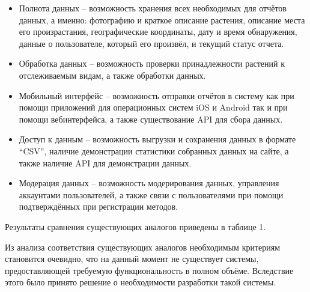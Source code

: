 \begin{itemize}[topsep=0pt, parsep=0pt, itemsep=0pt, wide=0.5cm]
	\item Полнота данных -- возможность хранения всех необходимых для отчётов данных, а именно: фотографию и краткое описание растения, описание места его произрастания, географические координаты, дату и время обнаружения, данные о пользователе, который его произвёл, и текущий статус отчета.
	\item Обработка данных -- возможность проверки принадлежности растений к отслеживаемым видам, а также обработки данных.
	\item Мобильный интерфейс -- возможность отправки отчётов в систему как при помощи приложений для операционных систем iOS и Android так и при помощи вебинтерфейса, а также существование API для сбора данных.
	\item Доступ к данным -- возможность выгрузки и сохранения данных в формате “CSV”, наличие демонстрации статистики собранных данных на сайте, а также наличие API для демонстрации данных.
	\item Модерация данных -- возможность модерирования данных, управления аккаунтами пользователей, а также связи с пользователями при помощи подтверждённых при регистрации методов.
\end{itemize}

\nwln
Результаты сравнения существующих аналогов приведены в таблице 1.
\tableone

\nwln
Из анализа соответствия существующих аналогов необходимым критериям становится очевидно, что на данный момент не существует системы, предоставляющей требуемую функциональность в полном объёме.
Вследствие этого было принято решение о необходимости разработки такой системы. 

